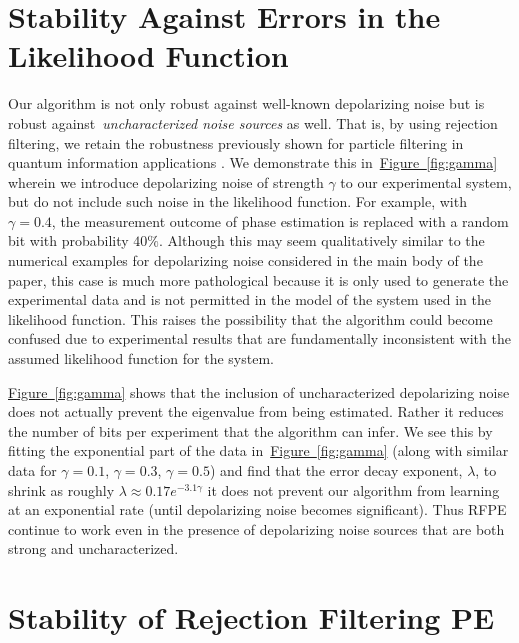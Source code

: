 \documentclass[aps,pra,amsmath,twocolumn,amssymb,superscriptaddress]{revtex4-1}
\newcommand{\fig}[1]{\hyperref[fig:#1]{Figure~\ref*{fig:#1}}}
\begin{document}
{%
\section{Stability Against Errors in the Likelihood Function}


Our algorithm is not only robust against well-known depolarizing noise but is robust against~\emph{uncharacterized noise sources} as well.
That is, by using rejection filtering, we retain the robustness previously shown for particle filtering
in quantum information applications \cite{ferrie_likelihood-free_2014,wiebe_quantum_2014-1,stenberg_efficient_2014}.
We demonstrate this in~\fig{gamma} wherein we introduce depolarizing noise of strength $\gamma$ to our experimental system, but do not include such noise in the likelihood function.  For example, with $\gamma=0.4$, the measurement outcome of phase estimation is replaced with a random bit with probability $40\%$.  Although this may seem qualitatively similar to the numerical examples for depolarizing noise considered in the main body of the paper, this case is much more pathological because it is only used to generate the experimental data and is not permitted in the model of the system used in the likelihood function.  This raises the possibility that the algorithm could become confused due to experimental results that are fundamentally inconsistent with the assumed likelihood function for the system.

\fig{gamma} shows that the inclusion of uncharacterized depolarizing noise does not actually prevent the eigenvalue from being estimated.  Rather it reduces the number of bits per experiment that the algorithm can infer.  We see this by fitting the exponential part of the data in~\fig{gamma} (along with similar data for $\gamma=0.1$, $\gamma=0.3$, $\gamma=0.5$) and find that the error decay exponent, $\lambda$, to shrink as roughly $\lambda \approx 0.17e^{-3.1\gamma}$ it does not prevent our algorithm from learning at an exponential rate (until depolarizing noise becomes significant).  Thus RFPE continue to work even in the presence of depolarizing noise sources that are both strong and uncharacterized.



\section{Stability of Rejection Filtering PE}
\label{app:stability}

}
\end{document}
